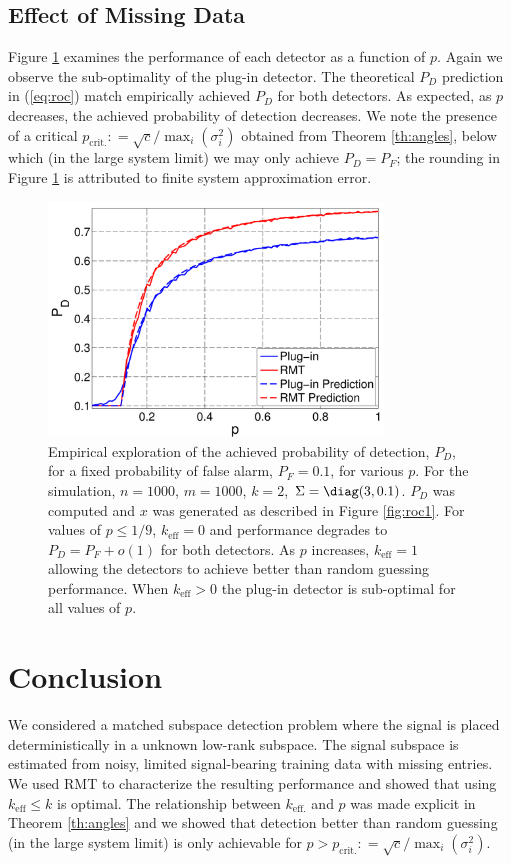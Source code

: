 \subsection{Effect of Missing Data}
Figure \ref{fig:sparsity} examines the performance of each detector as a function of $p$. Again we observe the sub-optimality of the plug-in detector. The theoretical $P_D$ prediction in (\ref{eq:roc}) match empirically achieved $P_D$ for both detectors. As expected, as $p$ decreases, the achieved probability of detection decreases. We note the presence of a critical $p_{\text{crit.}} : = \sqrt{c}/\max_{i}(\sigma_{i}^{2})$ obtained from Theorem \ref{th:angles}, below which (in the large system limit) we may only achieve $P_D=P_F$; the rounding in Figure \ref{fig:sparsity} is attributed to finite system approximation error.

\begin{figure}[t]
\centering
\includegraphics[width=3.5in]{figures/sparsity.pdf}
\caption{Empirical exploration of the achieved probability of detection, $P_D$, for a fixed probability of false alarm, $P_F=0.1$, for various $p$. For the simulation, $n=1000$, $m=1000$, $k=2$, $\Sigma=\diag(3,0.1)$. $P_D$ was computed and $x$ was generated as described in Figure \ref{fig:roc1}. For values of $p \leq 1/9$, $k_\text{eff}=0$ and performance degrades to $P_D = P_F +o(1)$ for both detectors. As $p$ increases, $k_\text{eff}=1$ allowing the detectors to achieve better than random guessing performance. When $k_\text{eff}>0$ the plug-in detector is sub-optimal for all values of $p$.}\vskip-0.15cm
\label{fig:sparsity}
\end{figure}

\section{Conclusion}\label{sec:conclusion}

We considered a matched subspace detection problem where the signal is placed deterministically in a unknown low-rank subspace. The signal subspace is estimated from noisy, limited signal-bearing training data with missing entries.  We used RMT to characterize the resulting performance and showed that using $k_\text{eff} \leq k$ is optimal. The relationship between $k_{\text{eff.}}$ and $p$ was made explicit in  Theorem \ref{th:angles} and we showed that detection better than random guessing (in the large system limit) is only achievable for $p > p_{\text{crit.}} : = \sqrt{c}/\max_{i}(\sigma_{i}^{2})$. 